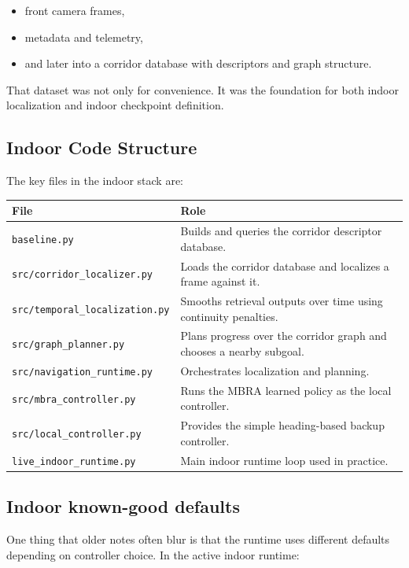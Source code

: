 \documentclass[11pt]{article}
\begin{document}
\begin{itemize}[nosep]
  \item front camera frames,
  \item metadata and telemetry,
  \item and later into a corridor database with descriptors and graph structure.
\end{itemize}

That dataset was not only for convenience. It was the foundation for both indoor
localization and indoor checkpoint definition.

\subsection{Indoor Code Structure}

The key files in the indoor stack are:

\begin{longtable}{p{}p{}}
\toprule
\textbf{File} & \textbf{Role} \\
\midrule
\texttt{baseline.py} & Builds and queries the corridor descriptor database. \\
\texttt{src/corridor\_localizer.py} & Loads the corridor database and localizes a frame against it. \\
\texttt{src/temporal\_localization.py} & Smooths retrieval outputs over time using continuity penalties. \\
\texttt{src/graph\_planner.py} & Plans progress over the corridor graph and chooses a nearby subgoal. \\
\texttt{src/navigation\_runtime.py} & Orchestrates localization and planning. \\
\texttt{src/mbra\_controller.py} & Runs the MBRA learned policy as the local controller. \\
\texttt{src/local\_controller.py} & Provides the simple heading-based backup controller. \\
\texttt{live\_indoor\_runtime.py} & Main indoor runtime loop used in practice. \\
\bottomrule
\end{longtable}

\subsection{Indoor known-good defaults}

One thing that older notes often blur is that the runtime uses different defaults
depending on controller choice. In the active indoor runtime:
\end{document}
